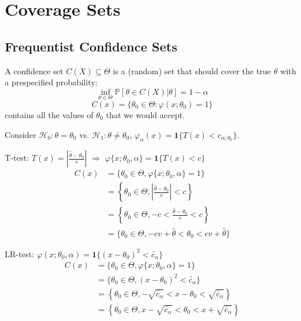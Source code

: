 \section{Coverage Sets}

\subsection{Frequentist Confidence Sets}

A confidence set $C (X) \subseteq \Theta$ is a (random) set that should cover
the true $\theta$ with a prespecified probability:
\[ \underset{\theta \in \Theta}{\inf} \mathbb{P} [\theta \in C (X) |
   \theta] = 1 - \alpha \]
\[ C (x) = \{ \theta_0 \in \Theta : \varphi (x ; \theta_0) = 1 \} \]
contains all the values of $\theta_0$ that we would accept.

Consider $\mathcal{H}_0 : \theta = \theta_0$ vs. $\mathcal{H}_1 : \theta \neq
\theta_0$, $\varphi_{\alpha} (x) = \mathbf{1} \{ T (x) < c_{\alpha ; \theta_0}
\}$.

\begin{eg}
  T-test: $T (x) = \left| \frac{\hat{\theta} - \theta_0}{v} \right|$
  $\Rightarrow$ $\varphi \{ x ; \theta_0, \alpha \} = \mathbf{1} \{ T (x) < c
  \}$
  \begin{align*}
    C (x) & = \{ \theta_0 \in \Theta, \varphi \{ x ; \theta_0, \alpha \} = 1
    \}\\
    & = \left\{ \theta_0 \in \Theta, \left| \frac{\hat{\theta} -
    \theta_0}{v} \right| < c \right\}\\
    & = \left\{ \theta_0 \in \Theta, - c < \frac{\hat{\theta} -
    \theta_0}{v} < c \right\}\\
    & = \{ \theta_0 \in \Theta, - c v + \hat{\theta} < \theta_0 < c v +
    \hat{\theta} \}
  \end{align*}
\end{eg}

\begin{eg}
  LR-test: $\varphi (x ; \theta_0, \alpha) = \mathbf{1} \{ (x - \theta_0)^2 <
  \tilde{c_{\alpha}} \}$
  \begin{align*}
    C (x) & = \{ \theta_0 \in \Theta, \varphi \{ x ; \theta_0, \alpha \} = 1
    \}\\
    & = \{ \theta_0 \in \Theta, (x - \theta_0)^2 < \tilde{c_{\alpha}}
    \}\\
    & = \left\{ \theta_0 \in \Theta, - \sqrt{\tilde{c_{\alpha}}} < x -
    \theta_0 < \sqrt{\tilde{c_{\alpha}}} \right\}\\
    & = \left\{ \theta_0 \in \Theta, x - \sqrt{\tilde{c_{\alpha}}} <
    \theta_0 < x + \sqrt{\tilde{c_{\alpha}}} \right\}
  \end{align*}
\end{eg}

